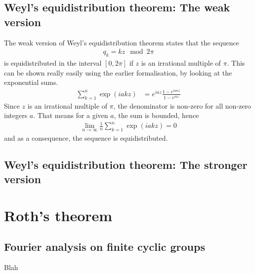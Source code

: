 \documentclass[12pt, titlepage]{article}
\theoremstyle{definition}
\begin{document}
\subsection{Weyl's equidistribution theorem: The weak version}
The weak version of Weyl's equidistribution theorem states that the sequence
\begin{align*}
    q_k = kz \mod 2\pi
\end{align*}
is equidistributed in the interval $[0,2\pi]$ if $z$ is an irrational multiple of $\pi$. This can be shown really easily using the earlier formalisation, by looking at the exponential sums.
\begin{align*}
    \sum_{k=1}^{n} \exp(iakz) &= e^{iaz} \frac{1 - e^{ianz}}{1 - e^{iaz}}
\end{align*}
Since $z$ is an irrational multiple of $\pi$, the denominator is non-zero for all non-zero integers $a$. That means for a given $a$, the sum is bounded, hence
\begin{align*}
    \lim\limits_{n \to \infty} \frac{1}{n} \sum_{k=1}^{n} \exp(iakz) = 0
\end{align*}
and as a consequence, the sequence is equidistributed.

\subsection{Weyl's equidistribution theorem: The stronger version}

\newpage

\section{Roth's theorem}

\subsection{Fourier analysis on finite cyclic groups}
Blah

\newpage




\end{document}
